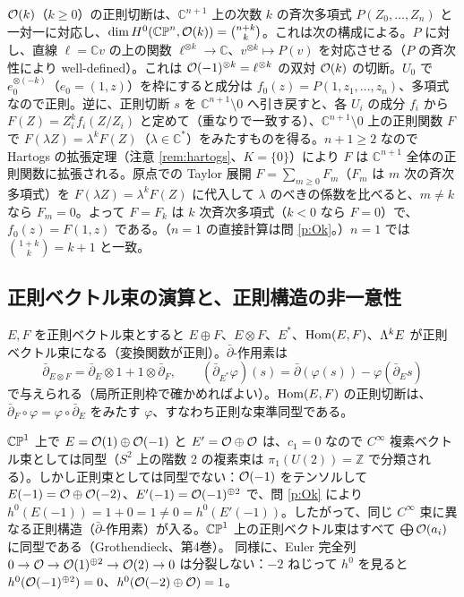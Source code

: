 \begin{ex}\label{ex:Hsec}\tC
$\mathcal O(k)$（$k\ge0$）の正則切断は、$\mathbb C^{n+1}$ 上の次数 $k$ の斉次多項式 $P(Z_0,\dots,Z_n)$ と一対一に対応し、$\dim H^0(\mathbb{CP}^n,\mathcal O(k))=\binom{n+k}k$。これは次の構成による。$P$ に対し、直線 $\ell=\mathbb C v$ の上の関数 $\ell^{\otimes k}\to\mathbb C$、$v^{\otimes k}\mapsto P(v)$ を対応させる（$P$ の斉次性により well-defined）。これは $\mathcal O(-1)^{\otimes k}=\ell^{\otimes k}$ の双対 $\mathcal O(k)$ の切断。$U_0$ で $e_0^{\otimes(-k)}$（$e_0=(1,z)$）を枠にすると成分は $f_0(z)=P(1,z_1,\dots,z_n)$、多項式なので正則。逆に、正則切断 $s$ を $\mathbb C^{n+1}\setminus0$ へ引き戻すと、各 $U_i$ の成分 $f_i$ から $F(Z)=Z_i^{k}f_i(Z/Z_i)$ と定めて（重なりで一致する）、$\mathbb C^{n+1}\setminus0$ 上の正則関数 $F$ で $F(\lambda Z)=\lambda^kF(Z)$（$\lambda\in\mathbb C^*$）をみたすものを得る。$n+1\ge2$ なので Hartogs の拡張定理（注意 \ref{rem:hartogs}、$K=\{0\}$）により $F$ は $\mathbb C^{n+1}$ 全体の正則関数に拡張される。原点での Taylor 展開 $F=\sum_{m\ge0}F_m$（$F_m$ は $m$ 次の斉次多項式）を $F(\lambda Z)=\lambda^kF(Z)$ に代入して $\lambda$ のべきの係数を比べると、$m\ne k$ なら $F_m=0$。よって $F=F_k$ は $k$ 次斉次多項式（$k<0$ なら $F=0$）で、$f_0(z)=F(1,z)$ である。（$n=1$ の直接計算は問 \ref{p:Ok}。）$n=1$ では $\binom{1+k}k=k+1$ と一致。
\end{ex}

\subsection{正則ベクトル束の演算と、正則構造の非一意性}
$E,F$ を正則ベクトル束とすると $E\oplus F$、$E\otimes F$、$E^*$、$\mathrm{Hom}(E,F)$、$\Lambda^kE$ が正則ベクトル束になる（変換関数が正則）。$\bar\partial$-作用素は
\[
\bar\partial_{E\otimes F}=\bar\partial_E\otimes1+1\otimes\bar\partial_F,\qquad(\bar\partial_{E^*}\varphi)(s)=\bar\partial(\varphi(s))-\varphi(\bar\partial_Es)
\]
で与えられる（局所正則枠で確かめればよい）。$\mathrm{Hom}(E,F)$ の正則切断は、$\bar\partial_F\circ\varphi=\varphi\circ\bar\partial_E$ をみたす $\varphi$、すなわち正則な束準同型である。

\begin{ex}[位相的には同じで正則には異なる束]\label{ex:nonuniq}\tP
$\mathbb{CP}^1$ 上で $E=\mathcal O(1)\oplus\mathcal O(-1)$ と $E'=\mathcal O\oplus\mathcal O$ は、$c_1=0$ なので $C^\infty$ 複素ベクトル束としては同型（$S^2$ 上の階数 2 の複素束は $\pi_1(U(2))=\mathbb Z$ で分類される）。しかし正則束としては同型でない：$\mathcal O(-1)$ をテンソルして $E(-1)=\mathcal O\oplus\mathcal O(-2)$、$E'(-1)=\mathcal O(-1)^{\oplus2}$ で、問 \ref{p:Ok} により $h^0(E(-1))=1+0=1\ne0=h^0(E'(-1))$。したがって、同じ $C^\infty$ 束に異なる正則構造（$\bar\partial$-作用素）が入る。$\mathbb{CP}^1$ 上の正則ベクトル束はすべて $\bigoplus\mathcal O(a_i)$ に同型である（Grothendieck、第4巻\tC\tQ）。
同様に、Euler 完全列 $0\to\mathcal O\to\mathcal O(1)^{\oplus2}\to\mathcal O(2)\to0$ は分裂しない：$-2$ ねじって $h^0$ を見ると $h^0(\mathcal O(-1)^{\oplus2})=0$、$h^0(\mathcal O(-2)\oplus\mathcal O)=1$。
\end{ex}

